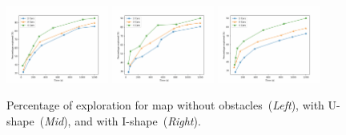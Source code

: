 \begin{figure}[t]
    \includegraphics[width=0.3\textwidth]{figs/exp-empty.png}
    \includegraphics[width=0.3\textwidth]{figs/exp-u-shape.png}
    \includegraphics[width=0.3\textwidth]{figs/exp-i-shape.png}
    \caption{Percentage of exploration for map without obstacles~(\emph{Left}), with U-shape~(\emph{Mid}), and with I-shape~(\emph{Right}).}\label{fig:percent}
\end{figure}

